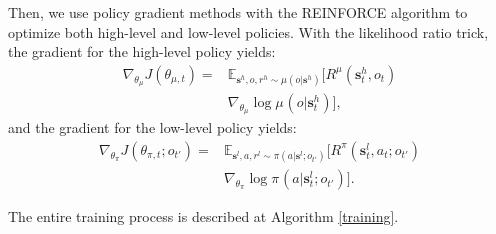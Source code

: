\documentclass[letterpaper]{article} %
\theoremstyle{definition}
\begin{document}
Then, we use policy gradient methods \cite{sutton2000policy} with the REINFORCE algorithm \cite{williams1992simple} to optimize both high-level and low-level policies.
With the likelihood ratio trick, the gradient for the high-level policy yields:
%
\begin{equation}\label{gradient_high}
    \begin{split}
        \nabla_{\theta_{\mu}} J(\theta_{{\mu},t}) =& \mathbb{E}_{\mathbf{s}^h,o,r^h \sim \mu(o|\mathbf{s}^h)} [R^\mu(\mathbf{s}_t^h, o_t) \\ & \nabla_{\theta_{\mu}} \log \mu_{}(o|\mathbf{s}_t^h)],
    \end{split}
\end{equation}
and the gradient for the low-level policy yields: %
\begin{equation}\label{gradient_low}
    \begin{split}
         \nabla_{\theta_{\pi}} J(\theta_{\pi,t};o_{t'}) =& \mathbb{E}_{\mathbf{s}^l,a,r^l \sim \pi(a|\mathbf{s}^l;o_{t'})} [R^\pi(\mathbf{s}_t^l, a_t; o_{t'}) \\ & \nabla_{\theta_{\pi}} \log \pi_{}(a|\mathbf{s}_t^l; o_{t'})].
    \end{split}
\end{equation}


The entire training process is described at Algorithm \ref{training}.
\end{document}
